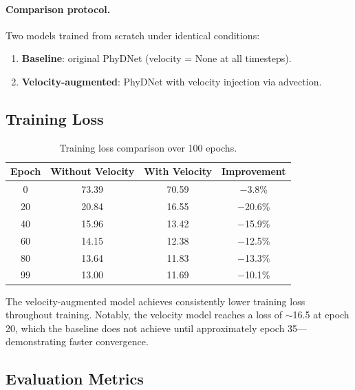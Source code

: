 \documentclass[11pt,a4paper]{article}
\begin{document}
\paragraph{Comparison protocol.} Two models trained from scratch under identical conditions:
\begin{enumerate}[nosep]
    \item \textbf{Baseline}: original PhyDNet (velocity = None at all timesteps).
    \item \textbf{Velocity-augmented}: PhyDNet with velocity injection via advection.
\end{enumerate}

\subsection{Training Loss}

\begin{table}[htbp]
\centering
\caption{Training loss comparison over 100 epochs.}
\begin{tabular}{cccc}
\toprule
\textbf{Epoch} & \textbf{Without Velocity} & \textbf{With Velocity} & \textbf{Improvement} \\
\midrule
0 & 73.39 & 70.59 & $-$3.8\% \\
20 & 20.84 & 16.55 & $-$20.6\% \\
40 & 15.96 & 13.42 & $-$15.9\% \\
60 & 14.15 & 12.38 & $-$12.5\% \\
80 & 13.64 & 11.83 & $-$13.3\% \\
99 & 13.00 & 11.69 & $-$10.1\% \\
\bottomrule
\end{tabular}
\label{tab:train_loss}
\end{table}

The velocity-augmented model achieves consistently lower training loss throughout training. Notably, the velocity model reaches a loss of $\sim$16.5 at epoch 20, which the baseline does not achieve until approximately epoch 35---demonstrating faster convergence.

\subsection{Evaluation Metrics}
\end{document}
